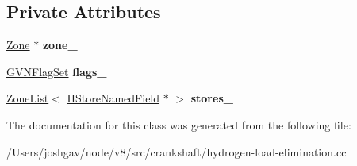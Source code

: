 \subsection*{Private Attributes}
\begin{DoxyCompactItemize}
\item 
\hyperlink{classv8_1_1internal_1_1_zone}{Zone} $\ast$ {\bfseries zone\+\_\+}\hypertarget{classv8_1_1internal_1_1_h_load_elimination_effects_a218a8b1201a7732cc4913b33e2e47422}{}\label{classv8_1_1internal_1_1_h_load_elimination_effects_a218a8b1201a7732cc4913b33e2e47422}

\item 
\hyperlink{classv8_1_1internal_1_1_enum_set}{G\+V\+N\+Flag\+Set} {\bfseries flags\+\_\+}\hypertarget{classv8_1_1internal_1_1_h_load_elimination_effects_a71dcb96c698a37d2e5a4a173cc1299a7}{}\label{classv8_1_1internal_1_1_h_load_elimination_effects_a71dcb96c698a37d2e5a4a173cc1299a7}

\item 
\hyperlink{classv8_1_1internal_1_1_zone_list}{Zone\+List}$<$ \hyperlink{classv8_1_1internal_1_1_h_store_named_field}{H\+Store\+Named\+Field} $\ast$ $>$ {\bfseries stores\+\_\+}\hypertarget{classv8_1_1internal_1_1_h_load_elimination_effects_ad8ac2b183ae5958563e379c01a4c4cc6}{}\label{classv8_1_1internal_1_1_h_load_elimination_effects_ad8ac2b183ae5958563e379c01a4c4cc6}

\end{DoxyCompactItemize}


The documentation for this class was generated from the following file\+:\begin{DoxyCompactItemize}
\item 
/\+Users/joshgav/node/v8/src/crankshaft/hydrogen-\/load-\/elimination.\+cc\end{DoxyCompactItemize}
